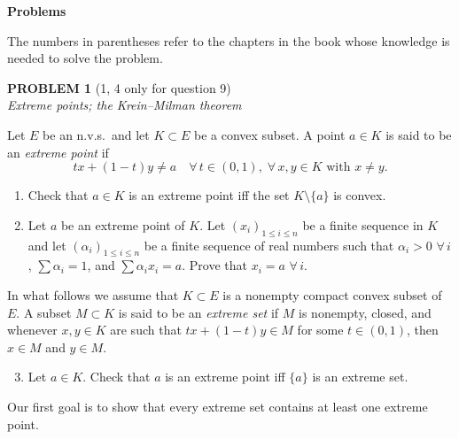 \documentclass[12pt]{article}
\begin{document}
\begin{center}
{\Large \textbf{Problems}}
\end{center}

\noindent The numbers in parentheses refer to the chapters in the book whose knowledge is
needed to solve the problem.

\bigskip

\noindent\textbf{PROBLEM 1} (1, 4 only for question 9)\\[4pt]
\textit{Extreme points; the Krein--Milman theorem}

\medskip

Let $E$ be an n.v.s.\ and let $K \subset E$ be a convex subset. A point $a \in K$ is said to be
an \emph{extreme point} if
\[
tx + (1-t)y \neq a \quad \forall\, t \in (0,1),\; \forall\, x, y \in K \text{ with } x \neq y.
\]

\begin{enumerate}
\item Check that $a \in K$ is an extreme point iff the set $K \setminus \{a\}$ is convex.

\item Let $a$ be an extreme point of $K$. Let $(x_i)_{1 \le i \le n}$ be a finite sequence in $K$
and let $(\alpha_i)_{1 \le i \le n}$ be a finite sequence of real numbers such that $\alpha_i > 0$
$\forall\, i$, $\sum \alpha_i = 1$, and $\sum \alpha_i x_i = a$. Prove that $x_i = a$ $\forall\, i$.
\end{enumerate}

\noindent In what follows we assume that $K \subset E$ is a nonempty compact convex subset
of $E$. A subset $M \subset K$ is said to be an \emph{extreme set} if $M$ is nonempty, closed,
and whenever $x, y \in K$ are such that $tx + (1-t)y \in M$ for some $t \in (0,1)$, then
$x \in M$ and $y \in M$.

\begin{enumerate}
\setcounter{enumi}{2}
\item Let $a \in K$. Check that $a$ is an extreme point iff $\{a\}$ is an extreme set.
\end{enumerate}

\noindent Our first goal is to show that every extreme set contains at least one extreme point.
\end{document}
